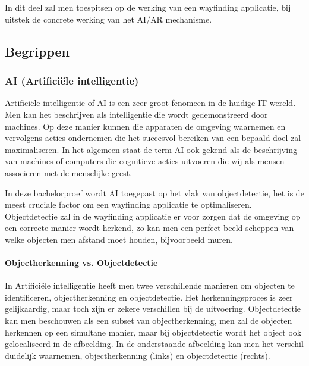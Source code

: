 \chapter{}
\label{ch:stand-van-zaken}




In dit deel zal men toespitsen op de werking van een wayfinding applicatie, bij uitstek de concrete werking van het AI/AR mechanisme.

\section{Begrippen}
\subsection{AI (Artificiële intelligentie)}
Artificiële intelligentie of AI is een zeer groot fenomeen in de huidige IT-wereld. Men kan het beschrijven als intelligentie die wordt gedemonstreerd door machines. Op deze manier kunnen die apparaten de omgeving waarnemen en vervolgens acties ondernemen die het succesvol bereiken van een bepaald doel zal maximaliseren. In het algemeen staat de term AI ook gekend als de beschrijving van machines of computers die cognitieve acties uitvoeren die wij als mensen associeren met de menselijke geest. 

In deze bachelorproef wordt AI toegepast op het vlak van objectdetectie, het is de meest cruciale factor om een wayfinding applicatie te optimaliseren.
Objectdetectie zal in de wayfinding applicatie er voor zorgen dat de omgeving op een correcte manier wordt herkend, zo kan men een perfect beeld scheppen van welke objecten men afstand moet houden, bijvoorbeeld muren.

\subsubsection{Objectherkenning vs. Objectdetectie}
In Artificiële intelligentie heeft men twee verschillende manieren om objecten te identificeren, objectherkenning en objectdetectie. Het herkenningsproces is zeer gelijkaardig, maar toch zijn er zekere verschillen bij de uitvoering. Objectdetectie kan men beschouwen als een subset van objectherkenning, men zal de objecten herkennen op een simultane manier, maar bij objectdetectie wordt het object ook gelocaliseerd in de afbeelding. In de onderstaande afbeelding kan men het verschil duidelijk waarnemen, objectherkenning (links) en objectdetectie (rechts).

